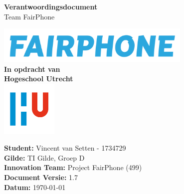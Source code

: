 \documentclass[a4paper]{report}
\newcommand{\latestVersion}{1.7}
\begin{document}
\begin{titlepage}
  \begin{center}
      \vspace*{.9cm}
      \Huge
      \textbf{ Verantwoordingsdocument }\\
      \vspace{0.2cm}
      \small Team FairPhone

      \normalsize


      \vspace{2cm}
      \includegraphics[width=0.7\textwidth]{Images/fairphone.png}
      \vspace{2cm}
      \Large\\
      \textbf{In opdracht van}\\
      \large
      \textbf{Hogeschool Utrecht} \\
      \includegraphics[width=0.2\textwidth]{Images/logouni.png}


      \vfill
    \end{center}
      \textbf{Student:} Vincent van Setten - 1734729 \\
      \textbf{Gilde:} TI Gilde, Groep D\\
      \textbf{Innovation Team:} Project FairPhone (499) \\
      \textbf{Document Versie:} \latestVersion \\
      \textbf{Datum:} \today \\
      \vspace{2cm}
\end{titlepage}



\tableofcontents
\end{document}
